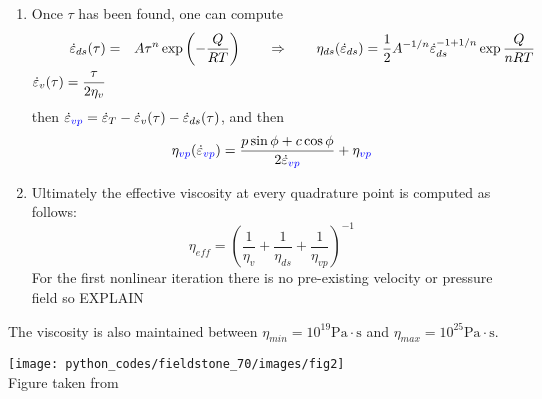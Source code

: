 \begin{enumerate}
{\it Say something about when we stop iterating}

\item Once $\tau$ has been found, one can compute 
\begin{eqnarray}
\dot{\varepsilon}_{ds}(\tau)&=&A \tau^n \exp \left(-\frac{Q}{RT}\right)
\qquad \Rightarrow \qquad 
\eta_{ds}(\dot\varepsilon_{ds}) = \frac{1}{2} A^{-1/n} \dot{\varepsilon}_{ds}^{-1+1/n} \exp \frac{Q}{nRT} \nonumber\\
\dot{\varepsilon}_{v}(\tau)=\frac{\tau}{2\eta_v}  \nonumber
\end{eqnarray}
then $\dot{\varepsilon}_{\color{blue}vp}=\dot{\varepsilon}_T -\dot{\varepsilon}_v(\tau) -\dot{\varepsilon}_{ds}(\tau)$,
and then 
\[
\eta_{\color{blue} vp}(\dot\varepsilon_{\color{blue} vp}) = \frac{p \sin \phi + c \cos \phi}{2 \dot{\varepsilon}_{\color{blue}vp}}  + \eta_{\color{blue} vp}
\]
\item 
Ultimately the effective viscosity at every quadrature point is computed as follows:
\[
\eta_{eff} = \left(\frac{1}{\eta_v} + \frac{1}{\eta_{ds}}  + \frac{1}{\eta_{vp}}  \right)^{-1}
\]
For the first nonlinear iteration there is no pre-existing velocity or pressure field so EXPLAIN 


\end{enumerate}



 
The viscosity is also maintained between $\eta_{min}=10^{19}\text{Pa}\cdot\text{s}$ 
and $\eta_{max}=10^{25}\text{Pa}\cdot\text{s}$.

\begin{center}
\texttt{[image: python\_codes/fieldstone\_70/images/fig2]}\\
{\captionfont Figure taken from \cite{dudy20}}
\end{center}



